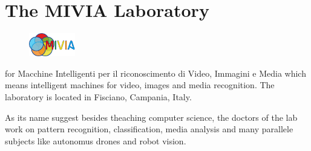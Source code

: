 \chapter[MIVIA Lab]{The MIVIA Laboratory}

\begin{figure}
	\vspace{-7mm}
	\includegraphics[width=2cm]{images_not_compressed/MIVIALogo.jpg}
	\end{figure}
 for Macchine Intelligenti per il riconoscimento di Video, Immagini e Media which means intelligent machines for video, images and media recognition. The laboratory is located in Fisciano, Campania, Italy. 
 
 \par As its name suggest besides theaching computer science, the doctors of the lab work on pattern recognition, classification, media analysis and many parallele subjects like autonomus drones and robot vision.